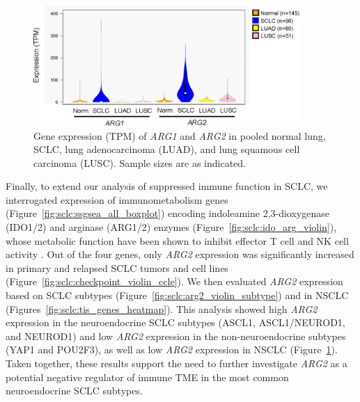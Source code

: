 \begin{figure}[htb]
    \centering
    \includegraphics[width=0.9\textwidth,keepaspectratio]{images/sclc/arg_violin}
    \vspace{-0.5cm}
    \caption[Relative expression of \textit{ARG1} and \textit{ARG2}.]{Gene expression (TPM) of \textit{ARG1} and \textit{ARG2} in pooled normal lung, SCLC, lung adenocarcinoma (LUAD), and lung squamous cell carcinoma (LUSC)\@. Sample sizes are as indicated.}
    \label{fig:sclc:arg_violin}
\end{figure}
Finally, to extend our analysis of suppressed immune function in SCLC, we interrogated expression of immunometabolism genes (Figure~\ref{fig:sclc:ssgsea_all_boxplot}) encoding indoleamine 2,3-dioxygenase (IDO1/2) and arginase (ARG1/2) enzymes (Figure~\ref{fig:sclc:ido_arg_violin}), whose metabolic function have been shown to inhibit effector T cell and NK cell activity \cite{osullivan2019,wang2012,grzywa2020}. Out of the four genes, only \textit{ARG2} expression was significantly increased in primary and relapsed SCLC tumors and cell lines (Figure~\ref{fig:sclc:checkpoint_violin_ccle}). We then evaluated \textit{ARG2} expression based on SCLC subtypes (Figure~\ref{fig:sclc:arg2_violin_subtype}) and in NSCLC (Figures~\ref{fig:sclc:tis_genes_heatmap}). This analysis showed high \textit{ARG2} expression in the neuroendocrine SCLC subtypes (ASCL1, ASCL1/NEUROD1, and NEUROD1) and low \textit{ARG2} expression in the non-neuroendocrine subtypes (YAP1 and POU2F3), as well as low \textit{ARG2} expression in NSCLC (Figure~\ref{fig:sclc:arg_violin}). Taken together, these results support the need to further investigate \textit{ARG2} as a potential negative regulator of immune TME in the most common neuroendocrine SCLC subtypes.

